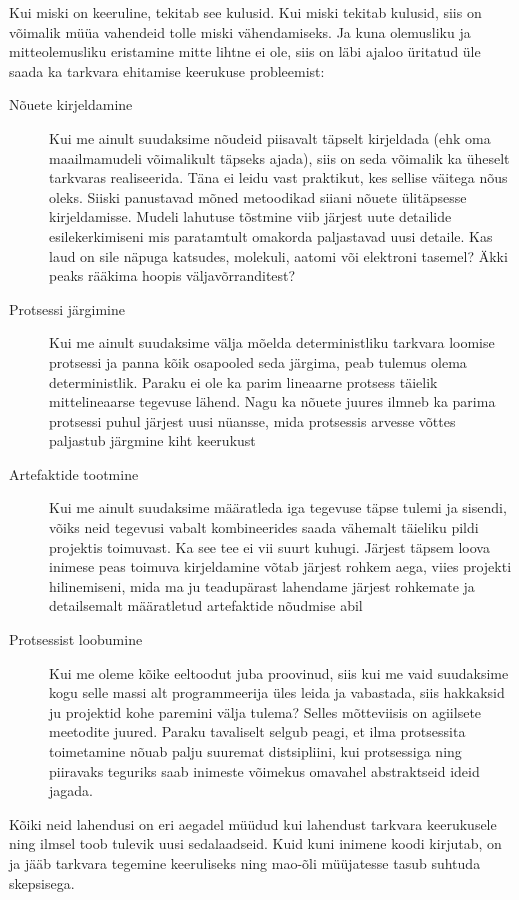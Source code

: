 Kui miski on keeruline, tekitab see kulusid. Kui miski tekitab kulusid, siis on võimalik müüa vahendeid tolle miski vähendamiseks. Ja kuna olemusliku ja mitteolemusliku eristamine mitte lihtne ei ole, siis on läbi ajaloo üritatud üle saada ka tarkvara ehitamise keerukuse probleemist:

\begin{description}
	\item[Nõuete kirjeldamine] Kui me ainult suudaksime nõudeid piisavalt täpselt kirjeldada (ehk oma maailmamudeli võimalikult täpseks ajada), siis on seda võimalik ka üheselt tarkvaras realiseerida. Täna ei leidu vast praktikut, kes sellise väitega nõus oleks. Siiski panustavad mõned metoodikad siiani nõuete ülitäpsesse kirjeldamisse. Mudeli lahutuse tõstmine viib järjest uute detailide esilekerkimiseni mis paratamtult omakorda paljastavad uusi detaile. Kas laud on sile näpuga katsudes, molekuli, aatomi või elektroni tasemel? Äkki peaks rääkima hoopis väljavõrranditest?
	\item[Protsessi järgimine] Kui me ainult suudaksime välja mõelda deterministliku tarkvara loomise protsessi ja panna kõik osapooled seda järgima, peab tulemus olema deterministlik. Paraku ei ole ka parim lineaarne protsess täielik mittelineaarse tegevuse lähend. Nagu ka nõuete juures ilmneb ka parima protsessi puhul järjest uusi nüansse, mida protsessis arvesse võttes paljastub järgmine kiht keerukust
	\item[Artefaktide tootmine] Kui me ainult suudaksime määratleda iga tegevuse täpse tulemi ja sisendi, võiks neid tegevusi vabalt kombineerides saada vähemalt täieliku pildi projektis toimuvast. Ka see tee ei vii suurt kuhugi. Järjest täpsem loova inimese peas toimuva kirjeldamine võtab järjest rohkem aega, viies projekti hilinemiseni, mida ma ju teadupärast lahendame järjest rohkemate ja detailsemalt määratletud artefaktide nõudmise abil
	\item[Protsessist loobumine] Kui me oleme kõike eeltoodut juba proovinud, siis kui me vaid suudaksime kogu selle massi alt programmeerija üles leida ja vabastada, siis hakkaksid ju projektid kohe paremini välja tulema? Selles mõtteviisis on agiilsete meetodite juured. Paraku tavaliselt selgub peagi, et ilma protsessita toimetamine nõuab palju suuremat distsipliini, kui protsessiga ning piiravaks teguriks saab inimeste võimekus omavahel abstraktseid ideid jagada. 
\end{description}

Kõiki neid lahendusi on eri aegadel müüdud kui lahendust tarkvara keerukusele ning ilmsel toob tulevik uusi sedalaadseid. Kuid kuni inimene koodi kirjutab, on ja jääb tarkvara tegemine keeruliseks ning mao-õli müüjatesse tasub suhtuda skepsisega.

